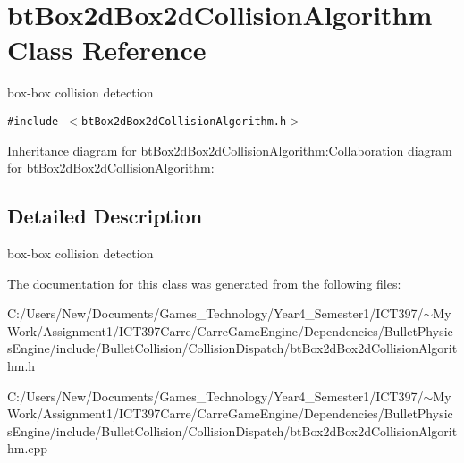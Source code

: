 \hypertarget{classbt_box2d_box2d_collision_algorithm}{
\section{btBox2dBox2dCollisionAlgorithm Class Reference}
\label{classbt_box2d_box2d_collision_algorithm}
}
box-box collision detection  


{\tt \#include $<$btBox2dBox2dCollisionAlgorithm.h$>$}

Inheritance diagram for btBox2dBox2dCollisionAlgorithm:Collaboration diagram for btBox2dBox2dCollisionAlgorithm:

\subsection{Detailed Description}
box-box collision detection 

The documentation for this class was generated from the following files:\begin{CompactItemize}
\item 
C:/Users/New/Documents/Games\_\-Technology/Year4\_\-Semester1/ICT397/$\sim$My Work/Assignment1/ICT397Carre/CarreGameEngine/Dependencies/BulletPhysicsEngine/include/BulletCollision/CollisionDispatch/btBox2dBox2dCollisionAlgorithm.h\item 
C:/Users/New/Documents/Games\_\-Technology/Year4\_\-Semester1/ICT397/$\sim$My Work/Assignment1/ICT397Carre/CarreGameEngine/Dependencies/BulletPhysicsEngine/include/BulletCollision/CollisionDispatch/btBox2dBox2dCollisionAlgorithm.cpp\end{CompactItemize}
